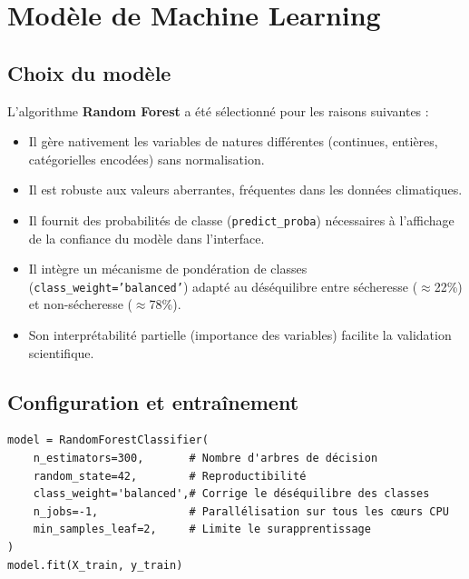 \documentclass[12pt,a4paper]{report}
\begin{document}
\chapter{Modèle de Machine Learning}

\section{Choix du modèle}

L'algorithme \textbf{Random Forest} a été sélectionné pour les raisons suivantes :

\begin{itemize}
    \item Il gère nativement les variables de natures différentes (continues, entières, catégorielles encodées) sans normalisation.
    \item Il est robuste aux valeurs aberrantes, fréquentes dans les données climatiques.
    \item Il fournit des probabilités de classe (\texttt{predict\_proba}) nécessaires à l'affichage de la confiance du modèle dans l'interface.
    \item Il intègre un mécanisme de pondération de classes (\texttt{class\_weight='balanced'}) adapté au déséquilibre entre sécheresse ($\approx$22\%) et non-sécheresse ($\approx$78\%).
    \item Son interprétabilité partielle (importance des variables) facilite la validation scientifique.
\end{itemize}

\section{Configuration et entraînement}

\begin{lstlisting}[style=pythonStyle, caption={Configuration du Random Forest (train\_models.py)}]
model = RandomForestClassifier(
    n_estimators=300,       # Nombre d'arbres de décision
    random_state=42,        # Reproductibilité
    class_weight='balanced',# Corrige le déséquilibre des classes
    n_jobs=-1,              # Parallélisation sur tous les cœurs CPU
    min_samples_leaf=2,     # Limite le surapprentissage
)
model.fit(X_train, y_train)
\end{lstlisting}
\end{document}
